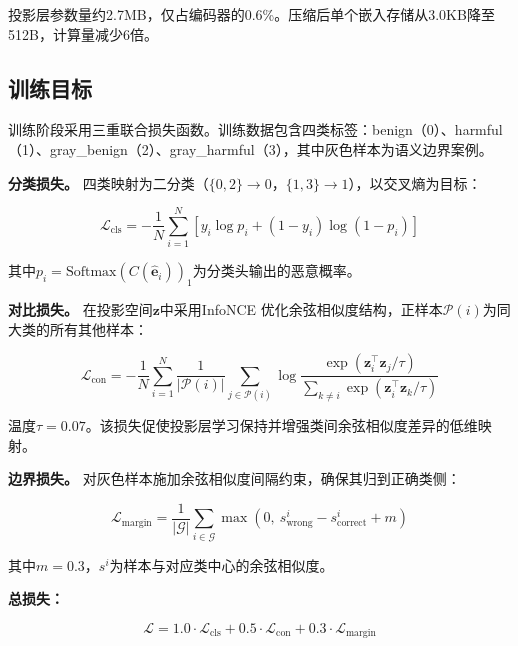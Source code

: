 \documentclass[conference]{IEEEtran}
\begin{document}
投影层参数量约2.7MB，仅占编码器的0.6\%。压缩后单个嵌入存储从3.0KB降至512B，计算量减少6倍。

\subsection{训练目标}

训练阶段采用三重联合损失函数。训练数据包含四类标签：benign（0）、harmful（1）、gray\_benign（2）、gray\_harmful（3），其中灰色样本为语义边界案例。

\textbf{分类损失。} 四类映射为二分类（$\{0,2\} \rightarrow 0$，$\{1,3\} \rightarrow 1$），以交叉熵为目标：

\begin{equation}
\mathcal{L}_{\text{cls}} = -\frac{1}{N} \sum_{i=1}^{N} \left[ y_i \log p_i + (1 - y_i) \log(1 - p_i) \right]
\label{eq:cls_loss}
\end{equation}

\noindent 其中$p_i = \text{Softmax}(C(\hat{\mathbf{e}}_i))_1$为分类头输出的恶意概率。

\textbf{对比损失。} 在投影空间$\mathbf{z}$中采用InfoNCE \cite{b17} 优化余弦相似度结构，正样本$\mathcal{P}(i)$为同大类的所有其他样本：

\begin{equation}
\mathcal{L}_{\text{con}} = -\frac{1}{N} \sum_{i=1}^{N} \frac{1}{|\mathcal{P}(i)|} \sum_{j \in \mathcal{P}(i)} \log \frac{\exp(\mathbf{z}_i^\top \mathbf{z}_j / \tau)}{\sum_{k \neq i} \exp(\mathbf{z}_i^\top \mathbf{z}_k / \tau)}
\label{eq:con_loss}
\end{equation}

\noindent 温度$\tau = 0.07$。该损失促使投影层学习保持并增强类间余弦相似度差异的低维映射。

\textbf{边界损失。} 对灰色样本施加余弦相似度间隔约束，确保其归到正确类侧：

\begin{equation}
\mathcal{L}_{\text{margin}} = \frac{1}{|\mathcal{G}|} \sum_{i \in \mathcal{G}} \max\left(0,\ s_{\text{wrong}}^i - s_{\text{correct}}^i + m\right)
\label{eq:margin_loss}
\end{equation}

\noindent 其中$m = 0.3$，$s^i$为样本与对应类中心的余弦相似度。

\textbf{总损失：}

\begin{equation}
\mathcal{L} = 1.0 \cdot \mathcal{L}_{\text{cls}} + 0.5 \cdot \mathcal{L}_{\text{con}} + 0.3 \cdot \mathcal{L}_{\text{margin}}
\label{eq:total_loss}
\end{equation}
\end{document}
